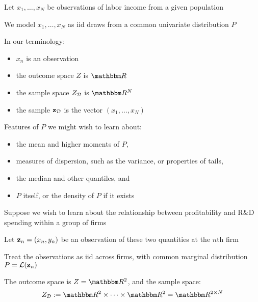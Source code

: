 \begin{frame}
    
    \vspace{2em}
    \Eg
    Let $x_1, \ldots, x_N$ be observations of labor
    income from a given population
    
    We model $x_1, \ldots, x_N$ as {\sc iid}
    draws from a common univariate distribution $P$
    
    In our terminology:
    \begin{itemize}
        \item $x_n$ is an observation
        \item the outcome space $Z$ is
                $\RR$
        \item the sample space $Z_{\mathcal D}$ is $\RR^N$
        \item the sample $\mathbf{z}_{\mathcal D}$ is the vector $(x_1, \ldots, x_N)$
    \end{itemize}
    
\end{frame}

\begin{frame}
    
    \vspace{2em}
    Features of $P$ we might wish to
    learn about:

    \begin{itemize}
        \item the mean and higher moments of $P$,
        \item measures of dispersion, such as the variance, or properties of
            tails,
        \item the median and other quantiles, and
        \item $P$ itself, or the density of $P$ if it exists
    \end{itemize}
\end{frame}

\begin{frame}
    
    \vspace{2em}
    \Eg
    Suppose we wish to learn about the relationship between profitability and
    R\&D spending within a group of firms
    
    Let ${\mathbf z}_n = (x_n, y_n)$ be an
    observation of these two quantities at the $n$th firm
    
    \vspace{.7em}
    Treat the
    observations as {\sc iid} across firms, with common marginal distribution $P =
    \mathcal L({\mathbf z}_n)$
    
    The outcome space is $Z = \RR^2$, and the sample space:
    \begin{equation*}
        \Zdata := \RR^2 \times \cdots \times \RR^2 = \RR^{2 \times N}
    \end{equation*}
    
\end{frame}

